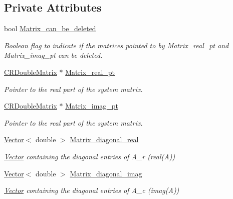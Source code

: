 \subsection*{Private Attributes}
\begin{DoxyCompactItemize}
\item 
bool \hyperlink{classoomph_1_1ComplexDampedJacobi_a36cb47a2cec4a979de7aa93ccc3dfc7f}{Matrix\+\_\+can\+\_\+be\+\_\+deleted}
\begin{DoxyCompactList}\small\item\em Boolean flag to indicate if the matrices pointed to by Matrix\+\_\+real\+\_\+pt and Matrix\+\_\+imag\+\_\+pt can be deleted. \end{DoxyCompactList}\item 
\hyperlink{classoomph_1_1CRDoubleMatrix}{C\+R\+Double\+Matrix} $\ast$ \hyperlink{classoomph_1_1ComplexDampedJacobi_aad28f093e125e259fb34b0c33269ec04}{Matrix\+\_\+real\+\_\+pt}
\begin{DoxyCompactList}\small\item\em Pointer to the real part of the system matrix. \end{DoxyCompactList}\item 
\hyperlink{classoomph_1_1CRDoubleMatrix}{C\+R\+Double\+Matrix} $\ast$ \hyperlink{classoomph_1_1ComplexDampedJacobi_a6f1e4350f4e9075d1bcb0fa518ffc0ea}{Matrix\+\_\+imag\+\_\+pt}
\begin{DoxyCompactList}\small\item\em Pointer to the real part of the system matrix. \end{DoxyCompactList}\item 
\hyperlink{classoomph_1_1Vector}{Vector}$<$ double $>$ \hyperlink{classoomph_1_1ComplexDampedJacobi_a5f8a5cd7da48fc81c9224c2c0a6d509e}{Matrix\+\_\+diagonal\+\_\+real}
\begin{DoxyCompactList}\small\item\em \hyperlink{classoomph_1_1Vector}{Vector} containing the diagonal entries of A\+\_\+r (real(\+A)) \end{DoxyCompactList}\item 
\hyperlink{classoomph_1_1Vector}{Vector}$<$ double $>$ \hyperlink{classoomph_1_1ComplexDampedJacobi_a68788038c7bd09732455662c5be2ab85}{Matrix\+\_\+diagonal\+\_\+imag}
\begin{DoxyCompactList}\small\item\em \hyperlink{classoomph_1_1Vector}{Vector} containing the diagonal entries of A\+\_\+c (imag(\+A)) \end{DoxyCompactList}\item 

\end{DoxyCompactItemize}
